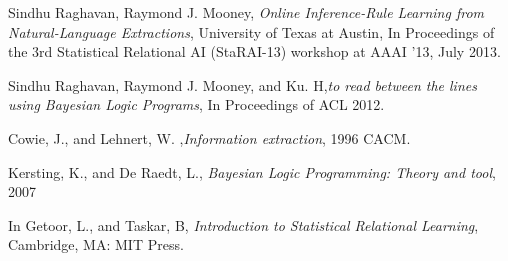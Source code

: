 \documentclass[12pt,a4paper]{article}
\begin{document}
\begin{thebibliography}{99}
  
  
 Sindhu Raghavan, Raymond J. Mooney, {\em
    Online Inference-Rule Learning from Natural-Language Extractions},
  University of Texas at Austin, In Proceedings of the 3rd Statistical
  Relational AI (StaRAI-13) workshop at AAAI '13, July 2013.

Sindhu Raghavan, Raymond J. Mooney, and
  Ku. H,{\em to read between the lines using Bayesian Logic Programs},
  In Proceedings of ACL 2012.

Cowie, J., and Lehnert, W. ,{\em Information
    extraction}, 1996 CACM.

Kersting, K., and De Raedt, L., {\em Bayesian
    Logic Programming: Theory and tool}, 2007

 In Getoor, L., and Taskar, B, {\em Introduction to
    Statistical Relational Learning}, Cambridge, MA: MIT Press.
\end{thebibliography}


	
\end{document}
